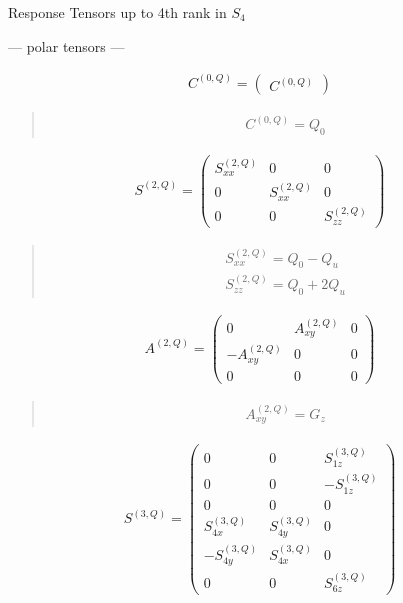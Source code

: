 \documentclass[fleqn,10pt]{jsarticle}
\begin{document}
\setcounter{MaxMatrixCols}{16}

\begin{center}
\LARGE
Response Tensors up to 4th rank in $S_{4}$
\end{center}
\begin{center}\LARGE --- polar tensors ---\end{center}
\begin{align*}
C^{(0,Q)} = \begin{pmatrix} C^{(0,Q)} \end{pmatrix}
\end{align*}
\begin{quote}
\begin{align*}
& C^{(0,Q)} = Q_{0}
\end{align*}
\end{quote}
\begin{align*}
S^{(2,Q)} = \begin{pmatrix} S^{(2,Q)}_{xx} & 0 & 0 \\ 0 & S^{(2,Q)}_{xx} & 0 \\ 0 & 0 & S^{(2,Q)}_{zz} \end{pmatrix}
\end{align*}
\begin{quote}
\begin{align*}
& S^{(2,Q)}_{xx} = Q_{0} - Q_{u} \\
& S^{(2,Q)}_{zz} = Q_{0} + 2 Q_{u}
\end{align*}
\end{quote}
\begin{align*}
A^{(2,Q)} = \begin{pmatrix} 0 & A^{(2,Q)}_{xy} & 0 \\ - A^{(2,Q)}_{xy} & 0 & 0 \\ 0 & 0 & 0 \end{pmatrix}
\end{align*}
\begin{quote}
\begin{align*}
& A^{(2,Q)}_{xy} = G_{z}
\end{align*}
\end{quote}
\begin{align*}
S^{(3,Q)} = \begin{pmatrix} 0 & 0 & S^{(3,Q)}_{1z} \\ 0 & 0 & - S^{(3,Q)}_{1z} \\ 0 & 0 & 0 \\ S^{(3,Q)}_{4x} & S^{(3,Q)}_{4y} & 0 \\ - S^{(3,Q)}_{4y} & S^{(3,Q)}_{4x} & 0 \\ 0 & 0 & S^{(3,Q)}_{6z} \end{pmatrix}
\end{align*}
\end{document}
